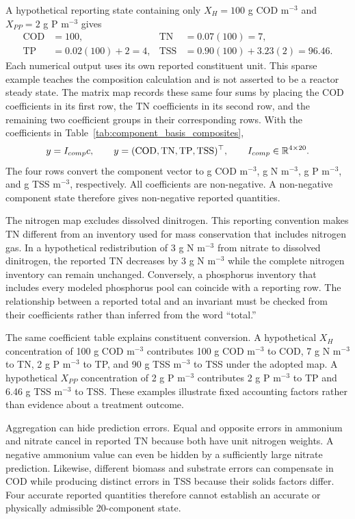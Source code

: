 A hypothetical reporting state containing only $X_H=100$ g COD m$^{-3}$ and $X_{PP}=2$ g P m$^{-3}$ gives
\[
\begin{aligned}
\mathrm{COD}&=100, &\mathrm{TN}&=0.07(100)=7,\\
\mathrm{TP}&=0.02(100)+2=4,
&\mathrm{TSS}&=0.90(100)+3.23(2)=96.46.
\end{aligned}
\]
Each numerical output uses its own reported constituent unit. This sparse example teaches the composition calculation and is not asserted to be a reactor steady state. The matrix map records these same four sums by placing the COD coefficients in its first row, the TN coefficients in its second row, and the remaining two coefficient groups in their corresponding rows. With the coefficients in Table~\ref{tab:component_basis_composites},
\begin{equation}
\equationname{Component-to-water-quality reporting map}
y=I_{comp}c,\qquad
y=(\mathrm{COD},\mathrm{TN},\mathrm{TP},\mathrm{TSS})^\top,\qquad
I_{comp}\in\mathbb{R}^{4\times20}.
\label{eq:component_composite_map}
\end{equation}
The four rows convert the component vector to g COD m$^{-3}$, g N m$^{-3}$, g P m$^{-3}$, and g TSS m$^{-3}$, respectively. All coefficients are non-negative. A non-negative component state therefore gives non-negative reported quantities.

The nitrogen map excludes dissolved dinitrogen. This reporting convention makes TN different from an inventory used for mass conservation that includes nitrogen gas. In a hypothetical redistribution of 3 g N m$^{-3}$ from nitrate to dissolved dinitrogen, the reported TN decreases by 3 g N m$^{-3}$ while the complete nitrogen inventory can remain unchanged. Conversely, a phosphorus inventory that includes every modeled phosphorus pool can coincide with a reporting row. The relationship between a reported total and an invariant must be checked from their coefficients rather than inferred from the word ``total.''

The same coefficient table explains constituent conversion. A hypothetical $X_H$ concentration of 100 g COD m$^{-3}$ contributes 100 g COD m$^{-3}$ to COD, 7 g N m$^{-3}$ to TN, 2 g P m$^{-3}$ to TP, and 90 g TSS m$^{-3}$ to TSS under the adopted map. A hypothetical $X_{PP}$ concentration of 2 g P m$^{-3}$ contributes 2 g P m$^{-3}$ to TP and 6.46 g TSS m$^{-3}$ to TSS. These examples illustrate fixed accounting factors rather than evidence about a treatment outcome.

Aggregation can hide prediction errors. Equal and opposite errors in ammonium and nitrate cancel in reported TN because both have unit nitrogen weights. A negative ammonium value can even be hidden by a sufficiently large nitrate prediction. Likewise, different biomass and substrate errors can compensate in COD while producing distinct errors in TSS because their solids factors differ. Four accurate reported quantities therefore cannot establish an accurate or physically admissible 20-component state.

